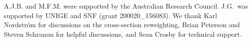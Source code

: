 A.J.B. and M.F.M. were supported by the Australian Research Council. J.G.~was supported by UNIGE and SNF (grant 200020_156083). We thank Karl Nordstr{\"o}m for discussions on the cross-section reweighting, Brian Peterson and Steven Schramm for helpful discussions, and Sean Crosby for technical support.